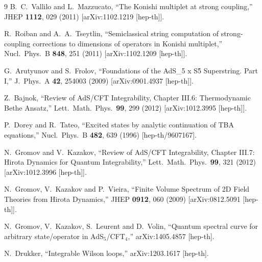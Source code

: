 \documentclass[a4paper,11pt]{article}
\numberwithin{equation}{section}
\begin{document}
\begin{thebibliography} {9}
  B.~C.~Vallilo and L.~Mazzucato,
  ``The Konishi multiplet at strong coupling,''
  JHEP {\bf 1112}, 029 (2011)
  [arXiv:1102.1219 [hep-th]].

  R.~Roiban and A.~A.~Tseytlin,
  ``Semiclassical string computation of strong-coupling corrections to dimensions of operators in Konishi multiplet,''
  Nucl.\ Phys.\ B {\bf 848}, 251 (2011)
  [arXiv:1102.1209 [hep-th]].

  G.~Arutyunov and S.~Frolov,
  ``Foundations of the AdS\_5 x S\^5 Superstring. Part I,''
  J.\ Phys.\ A {\bf 42}, 254003 (2009)
  [arXiv:0901.4937 [hep-th]].

  Z.~Bajnok,
  ``Review of AdS/CFT Integrability, Chapter III.6: Thermodynamic Bethe Ansatz,''
  Lett.\ Math.\ Phys.\  {\bf 99}, 299 (2012)
  [arXiv:1012.3995 [hep-th]].

  P.~Dorey and R.~Tateo,
  ``Excited states by analytic continuation of TBA equations,''
  Nucl.\ Phys.\ B {\bf 482}, 639 (1996)
  [hep-th/9607167].

  N.~Gromov and V.~Kazakov,
  ``Review of AdS/CFT Integrability, Chapter III.7: Hirota Dynamics for Quantum Integrability,''
  Lett.\ Math.\ Phys.\  {\bf 99}, 321 (2012)
  [arXiv:1012.3996 [hep-th]].

  N.~Gromov, V.~Kazakov and P.~Vieira,
  ``Finite Volume Spectrum of 2D Field Theories from Hirota Dynamics,''
  JHEP {\bf 0912}, 060 (2009)
  [arXiv:0812.5091 [hep-th]].

  N.~Gromov, V.~Kazakov, S.~Leurent and D.~Volin,
  ``Quantum spectral curve for arbitrary state/operator in AdS$_5$/CFT$_4$,''
  arXiv:1405.4857 [hep-th].

  N.~Drukker,
  ``Integrable Wilson loops,''
  arXiv:1203.1617 [hep-th].


\end{thebibliography}
\end{document}

